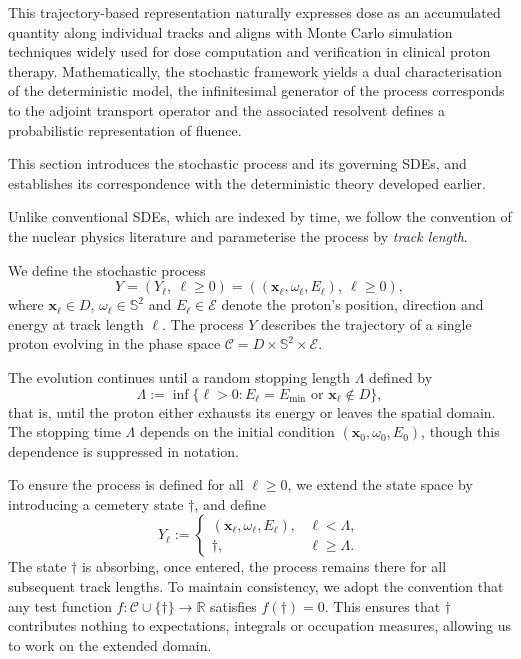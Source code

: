 \documentclass{amsart}
\theoremstyle{plain}
\renewcommand{\vec}[1]{\ensuremath{\boldsymbol{#1}}}
\begin{document}
This trajectory-based representation naturally expresses dose as an
accumulated quantity along individual tracks and aligns with Monte
Carlo simulation techniques widely used for dose computation and
verification in clinical proton therapy. Mathematically, the
stochastic framework yields a dual characterisation of the
deterministic model, the infinitesimal generator of the process
corresponds to the adjoint transport operator and the associated
resolvent defines a probabilistic representation of fluence.

This section introduces the stochastic process and its governing SDEs,
and establishes its correspondence with the deterministic theory
developed earlier.

Unlike conventional SDEs, which are indexed by time, we follow the
convention of the nuclear physics literature and parameterise the
process by \emph{track length}.

We define the stochastic process
\begin{equation}
  Y = (Y_\ell,~ \ell \ge 0) = ((\vec{x}_\ell, \omega_\ell, E_\ell),~ \ell \ge 0),
\end{equation}
where $\vec{x}_\ell \in D$, $\omega_\ell \in \mathbb{S}^2$ and $E_\ell
\in \mathcal{E}$ denote the proton's position, direction and energy at
track length $\ell$. The process $Y$ describes the trajectory of a
single proton evolving in the phase space $\mathcal{C} = D \times
\mathbb{S}^2 \times \mathcal{E}$.

The evolution continues until a random stopping length $\Lambda$ defined by
\begin{equation}
  \Lambda := \inf\{\ell > 0 : E_\ell = E_{\min} \text{ or } \vec{x}_\ell \notin D \},
\end{equation}
that is, until the proton either exhausts its energy or leaves the
spatial domain. The stopping time $\Lambda$ depends on the initial
condition $(\vec{x}_0, \omega_0, E_0)$, though this dependence is
suppressed in notation.

To ensure the process is defined for all $\ell \geq 0$, we extend the
state space by introducing a cemetery state $\dagger$, and define
\begin{equation}
  Y_\ell := 
  \begin{cases}
    (\vec{x}_\ell, \omega_\ell, E_\ell), & \ell < \Lambda, \\
    \dagger, & \ell \geq \Lambda.
  \end{cases}
\end{equation}
The state $\dagger$ is absorbing, once entered, the process remains
there for all subsequent track lengths. To maintain consistency, we
adopt the convention that any test function $f : \mathcal{C} \cup
\{\dagger\} \to \mathbb{R}$ satisfies $f(\dagger) = 0$. This ensures
that $\dagger$ contributes nothing to expectations, integrals or
occupation measures, allowing us to work on the extended domain.
\end{document}
